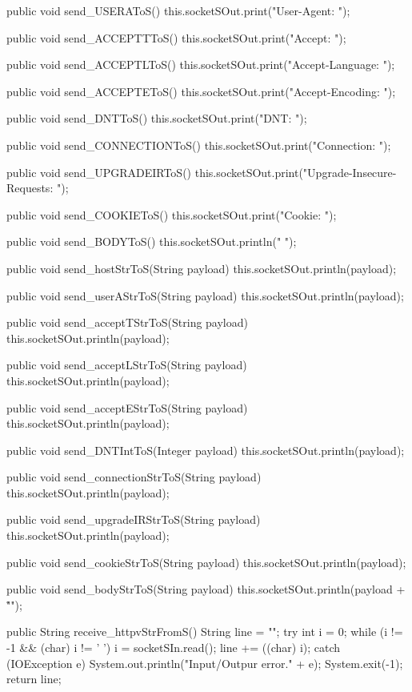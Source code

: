 \begin{code}
{    public void send_USERAToS() {
        this.socketSOut.print("User-Agent: ");
    }

    public void send_ACCEPTTToS() {
        this.socketSOut.print("Accept: ");
    }

    public void send_ACCEPTLToS() {
        this.socketSOut.print("Accept-Language: ");
    }

    public void send_ACCEPTEToS() {
        this.socketSOut.print("Accept-Encoding: ");
    }

    public void send_DNTToS() {
        this.socketSOut.print("DNT: ");
    }

    public void send_CONNECTIONToS() {
        this.socketSOut.print("Connection: ");
    }

    public void send_UPGRADEIRToS() {
        this.socketSOut.print("Upgrade-Insecure-Requests: ");
    }

    public void send_COOKIEToS() {
        this.socketSOut.print("Cookie: ");
    }

    public void send_BODYToS() {
        this.socketSOut.println(" ");
    }

    public void send_hostStrToS(String payload) {
        this.socketSOut.println(payload);
    }

    public void send_userAStrToS(String payload) {
        this.socketSOut.println(payload);
    }

    public void send_acceptTStrToS(String payload) {
        this.socketSOut.println(payload);
    }

    public void send_acceptLStrToS(String payload) {
        this.socketSOut.println(payload);
    }

    public void send_acceptEStrToS(String payload) {
        this.socketSOut.println(payload);
    }

    public void send_DNTIntToS(Integer payload) {
        this.socketSOut.println(payload);
    }

    public void send_connectionStrToS(String payload) {
        this.socketSOut.println(payload);
    }

    public void send_upgradeIRStrToS(String payload) {
        this.socketSOut.println(payload);
    }

    public void send_cookieStrToS(String payload) {
        this.socketSOut.println(payload);
    }

    public void send_bodyStrToS(String payload) {
        this.socketSOut.println(payload + "\r\n");
    }

    public String receive_httpvStrFromS() {
        String line = "";
        try {
            int i = 0;
            while (i != -1 && (char) i != ' ') {
                i = socketSIn.read();
                line += ((char) i);
            }
        } catch (IOException e) {
            System.out.println("Input/Outpur error." + e);
            System.exit(-1);
        }
        return line;
    }

}
\end{code}
